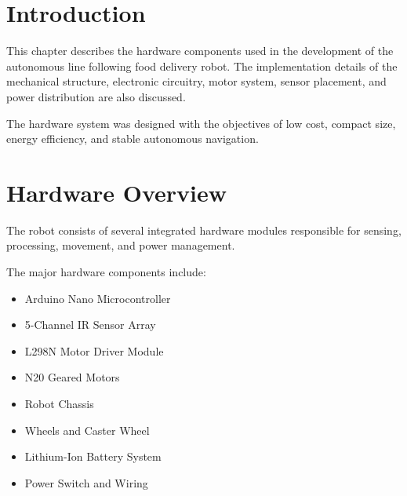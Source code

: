 \documentclass[12pt,a4paper,oneside]{report}
\begin{document}
\section{Introduction}

This chapter describes the hardware components used in the development of the autonomous line following food delivery robot. The implementation details of the mechanical structure, electronic circuitry, motor system, sensor placement, and power distribution are also discussed.

The hardware system was designed with the objectives of low cost, compact size, energy efficiency, and stable autonomous navigation.


\section{Hardware Overview}

The robot consists of several integrated hardware modules responsible for sensing, processing, movement, and power management.

The major hardware components include:

\begin{itemize}

\item Arduino Nano Microcontroller

\item 5-Channel IR Sensor Array

\item L298N Motor Driver Module

\item N20 Geared Motors

\item Robot Chassis

\item Wheels and Caster Wheel

\item Lithium-Ion Battery System

\item Power Switch and Wiring

\end{itemize}

\end{document}
